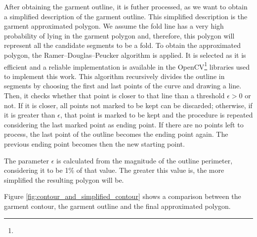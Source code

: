 After obtaining the garment outline, it is futher processed, as we want to obtain a simplified description of the garment outline. This simplified description is the garment approximated polygon. We assume the fold line has a very high probability of lying in the garment polygon and, therefore, this polygon will represent all the candidate segments to be a fold. To obtain the approximated polygon, the Ramer–Douglas–Peucker algorithm \cite{ramer1972iterative, douglas1973algorithms} is applied. It is selected as it is efficient and a reliable implementation is available in the OpenCV\footnote{} libraries used to implement this work. This algorithm recursively divides the outline in segments by choosing the first and last points of the curve and drawing a line. Then, it checks whether that point is closer to that line than a threshold $\epsilon > 0$ or not. If it is closer, all points not marked to be kept can be discarded; otherwise, if it is greater than $\epsilon$, that point is marked to be kept and the procedure is repeated considering the last marked point as ending point. If there are no points left to process, the last point of the outline becomes the ending point again. The previous ending point becomes then the new starting point.

The parameter $\epsilon$ is calculated from the magnitude of the outline perimeter, considering it to be 1\% of that value. The greater this value is, the more simplified the resulting polygon will be.

Figure \ref{fig:contour_and_simplified_contour} shows a comparison between the garment contour, the garment outline and the final approximated polygon.

